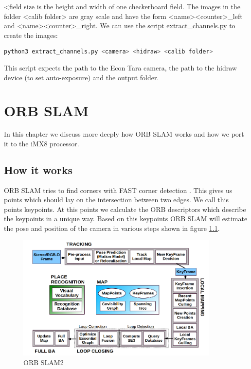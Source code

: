 \documentclass[11pt,a4paper,titlepage,oneside]{report}
\begin{document}
<field size is the height and width of one checkerboard field. The images in the folder <calib folder> are gray scale and have the form <name><counter>\_left and <name><counter>\_right. We can use the script extract\_channels.py to create the images:
\begin{lstlisting}[language=bash]
python3 extract_channels.py <camera> <hidraw> <calib folder>
\end{lstlisting}
This script expects the path to the Econ Tara camera, the path to the hidraw device (to set auto-exposure) and the output folder.

\chapter{ORB SLAM}\label{chap:implementation}

In this chapter we discuss more deeply how ORB SLAM works and how we port it to the iMX8 processor.

\section{How it works}
ORB SLAM tries to find corners with FAST corner detection \cite{fast}. This gives us points which should lay on the intersection between two edges. We call this points keypoints. At this points we calculate the ORB descriptors \cite{orb} which describe the keypoints in a unique way. Based on this keypoints ORB SLAM will estimate the pose and position of the camera in various steps shown in figure \ref{fig:orb_slam2}.

\begin{figure}[H]
  \begin{center}
		\includegraphics[width=0.9\textwidth]{img/orb_slam2.png}
  \end{center}
	\caption{ORB SLAM2 \cite{orbslam2}}\label{fig:orb_slam2}
\end{figure}
\end{document}
